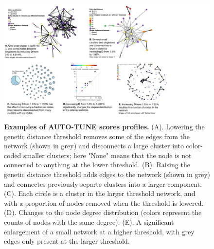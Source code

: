 \documentclass[utf8]{FrontiersinHarvard} %
\begin{document}
\begin{figure}[h!]
	\centering
	\includegraphics[width=1.\textwidth]{figures/examples.pdf}
	\vspace{0.01in}
	\caption{\textbf{Examples of AUTO-TUNE scores profiles.}
		(A). Lowering the genetic distance threshold removes some of the edges from the network (shown in grey) and disconnects a large cluster into color-coded smaller clusters; here "None" means that the node is not connected to anything at the lower threshold. (B). Raising the genetic distance threshold adds edges to the network (shown in grey) and connectes previously separte clusters into a larger component. (C). Each circle is a cluster in the larger threshold network, and with a proportion of nodes removed when the threshold is lowered. (D). Changes to the node degree distribution (colors represent the counts of nodes with the same degree). (E). A significant enlargement of a small network at a higher threshold, with grey edges only present at the larger threshold. }
	\label{fig:examples}
\end{figure}
\end{document}
